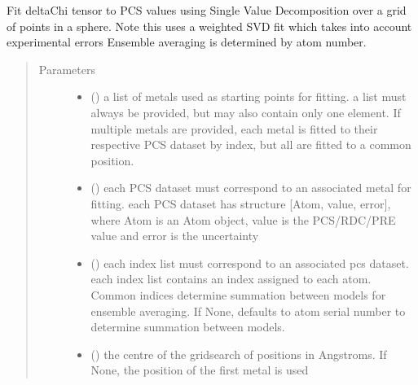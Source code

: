 \documentclass[a4paper,10pt,english,openany,oneside]{sphinxmanual}
\begin{document}
\begin{fulllineitems}
\label{\detokenize{reference/generated/paramagpy.fit.svd_gridsearch_fit_metal_from_pcs:paramagpy.fit.svd_gridsearch_fit_metal_from_pcs}}
Fit deltaChi tensor to PCS values using Single Value Decomposition over
a grid of points in a sphere.
Note this uses a weighted SVD fit which takes into account
experimental errors
Ensemble averaging is determined by atom number.
\begin{quote}\begin{description}
\item[{Parameters}] \leavevmode\begin{itemize}
\item {} 
 () \textendash{} a list of metals used as starting points for fitting.
a list must always be provided, but may also contain
only one element. If multiple metals are provided, each metal
is fitted to their respective PCS dataset by index, but all are
fitted to a common position.

\item {} 
 () \textendash{} each PCS dataset must correspond to an associated metal for fitting.
each PCS dataset has structure {[}Atom, value, error{]}, where Atom is
an Atom object, value is the PCS/RDC/PRE value
and error is the uncertainty

\item {} 
 (\sphinxstyleliteralemphasis{\sphinxupquote{, }}) \textendash{} each index list must correspond to an associated pcs dataset.
each index list contains an index assigned to each atom.
Common indices determine summation between models
for ensemble averaging.
If None, defaults to atom serial number to determine summation
between models.

\item {} 
 (\sphinxstyleliteralemphasis{\sphinxupquote{, }}) \textendash{} the centre of the gridsearch of positions in Angstroms.
If None, the position of the first metal is used


\end{itemize}
\end{description}
\end{quote}
\end{fulllineitems}
\end{document}
